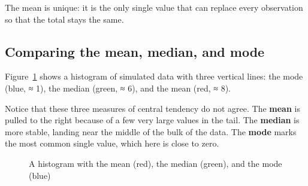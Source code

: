 \documentclass[
  letterpaper,
  DIV=11,
  numbers=noendperiod]{scrreprt}
\begin{document}
\begin{tcolorbox}[enhanced jigsaw, title=\textcolor{quarto-callout-note-color}{\faInfo}\hspace{0.5em}{Takeaway}, colframe=quarto-callout-note-color-frame, colbacktitle=quarto-callout-note-color!10!white, bottomtitle=1mm, leftrule=.75mm, rightrule=.15mm, titlerule=0mm, arc=.35mm, colback=white, opacitybacktitle=0.6, toprule=.15mm, toptitle=1mm, bottomrule=.15mm, coltitle=black, breakable, left=2mm, opacityback=0]

The mean is unique: it is the only single value that can replace every
observation so that the total stays the same.

\end{tcolorbox}

\subsection{Comparing the mean, median, and
mode}\label{comparing-the-mean-median-and-mode}

Figure~\ref{fig-meanmodemed} shows a histogram of simulated data with
three vertical lines: the mode (blue, ≈ 1), the median (green, ≈ 6), and
the mean (red, ≈ 8).

Notice that these three measures of central tendency do not agree. The
\textbf{mean} is pulled to the right because of a few very large values
in the tail. The \textbf{median} is more stable, landing near the middle
of the bulk of the data. The \textbf{mode} marks the most common single
value, which here is close to zero.

\begin{figure}


\caption{\label{fig-meanmodemed}A histogram with the mean (red), the
median (green), and the mode (blue)}

\end{figure}%
\end{document}

